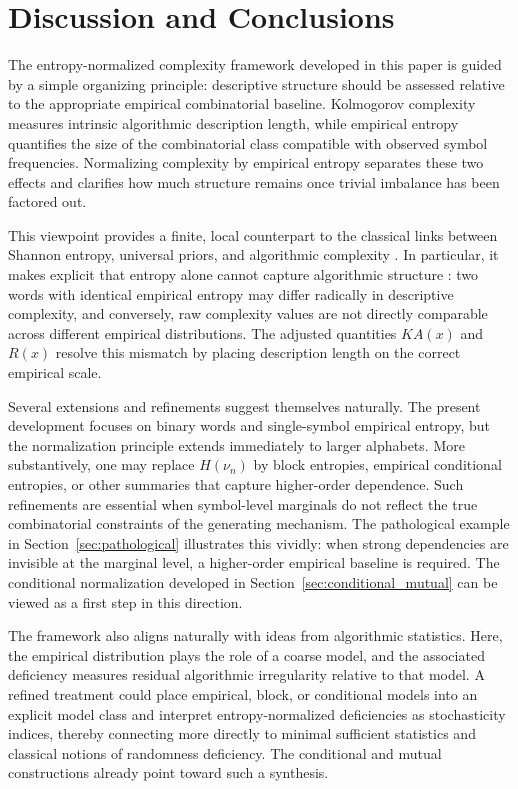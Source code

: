 \documentclass[12pt]{article}
\begin{document}
\section{Discussion and Conclusions}
\label{sec:discussion}

The entropy-normalized complexity framework developed in this paper is guided by
a simple organizing principle: descriptive structure should be assessed relative
to the appropriate empirical combinatorial baseline. Kolmogorov complexity
measures intrinsic algorithmic description length, while empirical entropy
quantifies the size of the combinatorial class compatible with observed symbol
frequencies. Normalizing complexity by empirical entropy separates these two
effects and clarifies how much structure remains once trivial imbalance has been
factored out.

This viewpoint provides a finite, local counterpart to the classical links
between Shannon entropy, universal priors, and algorithmic complexity
\citep{Solomonoff1964,Solomonoff1964b,Chaitin1975ProgramSize}. In particular, it
makes explicit that entropy alone cannot capture algorithmic structure
\citep{Kramosil1982}: two words with identical empirical entropy may differ
radically in descriptive complexity, and conversely, raw complexity values are
not directly comparable across different empirical distributions. The adjusted
quantities $KA(x)$ and $R(x)$ resolve this mismatch by placing description length
on the correct empirical scale.

Several extensions and refinements suggest themselves naturally. The present
development focuses on binary words and single-symbol empirical entropy, but the
normalization principle extends immediately to larger alphabets. More
substantively, one may replace $H(\nu_n)$ by block entropies, empirical
conditional entropies, or other summaries that capture higher-order dependence.
Such refinements are essential when symbol-level marginals do not reflect the
true combinatorial constraints of the generating mechanism. The pathological
example in Section~\ref{sec:pathological} illustrates this vividly: when strong
dependencies are invisible at the marginal level, a higher-order empirical
baseline is required. The conditional normalization developed in
Section~\ref{sec:conditional_mutual} can be viewed as a first step in this
direction.

The framework also aligns naturally with ideas from algorithmic statistics.
Here, the empirical distribution plays the role of a coarse model, and the
associated deficiency measures residual algorithmic irregularity relative to
that model. A refined treatment could place empirical, block, or conditional
models into an explicit model class and interpret entropy-normalized
deficiencies as stochasticity indices, thereby connecting more directly to
minimal sufficient statistics and classical notions of randomness deficiency.
The conditional and mutual constructions already point toward such a synthesis.
\end{document}
